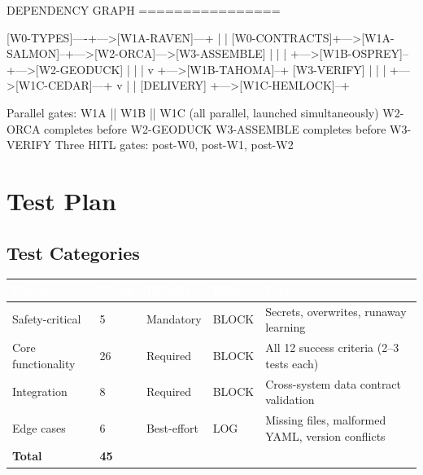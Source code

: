 \documentclass[11pt,letterpaper]{article}
\newcommand{\tableheader}[1]{\textbf{\sffamily\textcolor{white}{#1}}}
\begin{document}
\begin{asciibox}
DEPENDENCY GRAPH
================

[W0-TYPES]----+--->[W1A-RAVEN]---+
              |                   |
[W0-CONTRACTS]+--->[W1A-SALMON]--+--->[W2-ORCA]--->[W3-ASSEMBLE]
              |                   |                      |
              +--->[W1B-OSPREY]--+--->[W2-GEODUCK]       |
              |                   |                      v
              +--->[W1B-TAHOMA]--+                [W3-VERIFY]
              |                   |                      |
              +--->[W1C-CEDAR]---+                       v
              |                   |               [DELIVERY]
              +--->[W1C-HEMLOCK]--+

Parallel gates:
  W1A || W1B || W1C  (all parallel, launched simultaneously)
  W2-ORCA completes before W2-GEODUCK
  W3-ASSEMBLE completes before W3-VERIFY
  Three HITL gates: post-W0, post-W1, post-W2
\end{asciibox}

\section{Test Plan}

\subsection{Test Categories}

\begin{center}
\begin{tabularx}{\textwidth}{L{4cm}C{1.5cm}L{2cm}L{2cm}X}
\toprule
{}
\tableheader{Category} & \tableheader{Count} & \tableheader{Priority} & \tableheader{Failure} & \tableheader{Focus} \\
\midrule
Safety-critical & 5 & Mandatory & BLOCK & Secrets, overwrites, runaway learning \\
Core functionality & 26 & Required & BLOCK & All 12 success criteria (2--3 tests each) \\
Integration & 8 & Required & BLOCK & Cross-system data contract validation \\
Edge cases & 6 & Best-effort & LOG & Missing files, malformed YAML, version conflicts \\
\midrule
\textbf{Total} & \textbf{45} & & & \\
\bottomrule
\end{tabularx}
\end{center}
\end{document}
